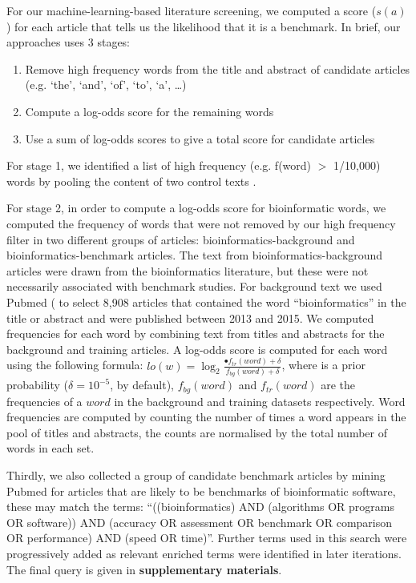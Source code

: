 \documentclass[fleqn,10pt]{SelfArx} %
\begin{document}
For our machine-learning-based literature screening, we computed a
score ($s(a)$) for each article that tells us the likelihood that it
is a benchmark. In brief, our approaches uses 3 stages:
\begin{enumerate}
\item Remove high frequency words from the title and abstract of candidate articles (e.g. ‘the’, ‘and’, ‘of’, ‘to’, ‘a’, …) 
\item Compute a log-odds score for the remaining words 
\item Use a sum of log-odds scores to give a total score for candidate articles
\end{enumerate}
For stage 1, we identified a list of high frequency (e.g. f(word) $>$
1/10,000) words by pooling the content of two control texts
\cite{Carroll1865-hk,Tolkien1937-ke}.

For stage 2, in order to compute a log-odds score for bioinformatic
words, we computed the frequency of words that were not removed by our
high frequency filter in two different groups of articles:
bioinformatics-background and bioinformatics-benchmark articles. The
text from bioinformatics-background articles were drawn from the
bioinformatics literature, but these were not necessarily associated
with benchmark studies. For background text we used Pubmed
(\cite{Sayers2010-vm,McEntyre2001-fl} to select 8,908 articles that
contained the word “bioinformatics” in the title or abstract and were
published between 2013 and 2015. We computed frequencies for each word
by combining text from titles and abstracts for the background and
training articles. A log-odds score is computed for each word using
the following formula:
$lo(w)=\log_2\frac{•f_{tr}(word)+\delta}{f_{bg}(word)+\delta}$, where
is a prior probability ($\delta = 10^{-5}$, by default),
$f_{bg}(word)$ and $f_{tr}(word)$ are the frequencies of a $word$ in
the background and training datasets respectively. Word frequencies
are computed by counting the number of times a word appears in the
pool of titles and abstracts, the counts are normalised by the total
number of words in each set.

Thirdly, we also collected a group of candidate benchmark articles by
mining Pubmed for articles that are likely to be benchmarks of
bioinformatic software, these may match the terms: “((bioinformatics)
AND (algorithms OR programs OR software)) AND (accuracy OR assessment
OR benchmark OR comparison OR performance) AND (speed OR
time)”. Further terms used in this search were progressively added as
relevant enriched terms were identified in later iterations. The final
query is given in \textbf{supplementary materials}.
\end{document}
